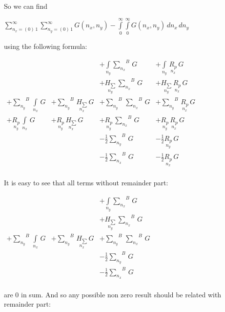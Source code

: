 \documentclass[11pt]{article}
\begin{document}
    So we can find

\(\sum\limits_{n_x=\left(0\right)\,1}^{\infty} \sum\limits_{n_y=\left(0\right)\,1}^{\infty} G\left(n_x, n_y\right) - \int\limits_{0}^{\infty} \int\limits_{0}^{\infty} G\left(n_x, n_y\right)\,d{n_x}\,d{n_y}\)

using the following formula:

    \(\begin{array}{llll}  \,&  \,&  + \int\limits_{n_y}^{}{\sum\limits_{n_x}^{}}^{B}\,G &  + \int\limits_{n_y}^{}\,\underset{n_x}{R_{p}}\,G \\  \,&  \,&  + \underset{n_y}{H_{\sum}}\,{\sum\limits_{n_x}^{}}^{B}\,G &  + \underset{n_y}{H_{\sum}}\,\underset{n_x}{R_{p}}\,G \\  + {\sum\limits_{n_y}^{}}^{B}\,\int\limits_{n_x}^{}\,G &  + {\sum\limits_{n_y}^{}}^{B}\,\underset{n_x}{H_{\sum}}\,G &  + {\sum\limits_{n_y}^{}}^{B}\,{\sum\limits_{n_x}^{}}^{B}\,G &  + {\sum\limits_{n_y}^{}}^{B}\,\underset{n_x}{R_{p}}\,G \\  + \underset{n_y}{R_{p}}\,\int\limits_{n_x}^{}\,G &  + \underset{n_y}{R_{p}}\,\underset{n_x}{H_{\sum}}\,G &  + \underset{n_y}{R_{p}}\,{\sum\limits_{n_x}^{}}^{B}\,G &  + \underset{n_y}{R_{p}}\,\underset{n_x}{R_{p}}\,G \\  \,&  \,&  - \frac{1}{2}{\sum\limits_{n_y}^{}}^{B}\,G &  - \frac{1}{2}\underset{n_y}{R_{p}}\,G \\  \,&  \,&  - \frac{1}{2}{\sum\limits_{n_x}^{}}^{B}\,G &  - \frac{1}{2}\underset{n_x}{R_{p}}\,G \\ \end{array}\)

    It is easy to see that all terms without remainder part:

    \(\begin{array}{llll}  \,&  \,&  + \int\limits_{n_y}^{}{\sum\limits_{n_x}^{}}^{B}\,G \\  \,&  \,&  + \underset{n_y}{H_{\sum}}\,{\sum\limits_{n_x}^{}}^{B}\,G \\  + {\sum\limits_{n_y}^{}}^{B}\,\int\limits_{n_x}^{}\,G &  + {\sum\limits_{n_y}^{}}^{B}\,\underset{n_x}{H_{\sum}}\,G &  + {\sum\limits_{n_y}^{}}^{B}\,{\sum\limits_{n_x}^{}}^{B}\,G\\  \,&  \,&  - \frac{1}{2}{\sum\limits_{n_y}^{}}^{B}\,G \\  \,&  \,&  - \frac{1}{2}{\sum\limits_{n_x}^{}}^{B}\,G \\ \end{array}\)

    are 0 in sum. And so any possible non zero result should be related with
remainder part:
\end{document}
